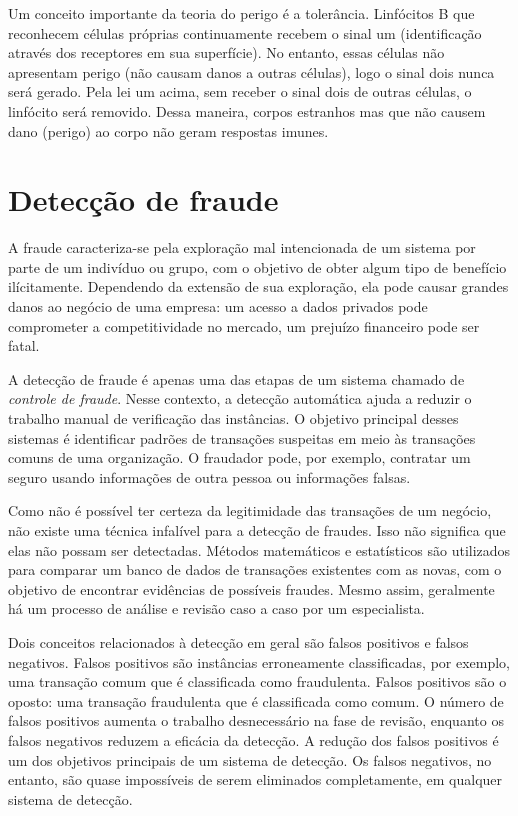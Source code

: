 \documentclass{iiufrgs}
\begin{document}
Um conceito importante da teoria do perigo é a tolerância. Linfócitos B que reconhecem células próprias continuamente recebem o sinal um (identificação através dos receptores em sua superfície). No entanto, essas células não apresentam perigo (não causam danos a outras células), logo o sinal dois nunca será gerado. Pela lei um acima, sem receber o sinal dois de outras células, o linfócito será removido. Dessa maneira, corpos estranhos mas que não causem dano (perigo) ao corpo não geram respostas imunes.

\newpage

\chapter{Detecção de fraude}

A fraude caracteriza-se pela exploração mal intencionada de um sistema por parte de um indivíduo ou grupo, com o objetivo de obter algum tipo de benefício ilícitamente. Dependendo da extensão de sua exploração, ela pode causar grandes danos ao negócio de uma empresa: um acesso a dados privados pode comprometer a competitividade no mercado, um prejuízo financeiro pode ser fatal.

A detecção de fraude é apenas uma das etapas de um sistema chamado de \emph{controle de fraude}. Nesse contexto, a detecção automática ajuda a reduzir o trabalho manual de verificação das instâncias. O objetivo principal desses sistemas é identificar padrões de transações suspeitas em meio às transações comuns de uma organização. O fraudador pode, por exemplo, contratar um seguro usando informações de outra pessoa ou informações falsas.

Como não é possível ter certeza da legitimidade das transações de um negócio, não existe uma técnica infalível para a detecção de fraudes. Isso não significa que elas não possam ser detectadas. Métodos matemáticos e estatísticos são utilizados para comparar um banco de dados de transações existentes com as novas, com o objetivo de encontrar evidências de possíveis fraudes. Mesmo assim, geralmente há um processo de análise e revisão caso a caso por um especialista.

Dois conceitos relacionados à detecção em geral são falsos positivos e falsos negativos. Falsos positivos são instâncias erroneamente classificadas, por exemplo, uma transação comum que é classificada como fraudulenta. Falsos positivos são o oposto: uma transação fraudulenta que é classificada como comum. O número de falsos positivos aumenta o trabalho desnecessário na fase de revisão, enquanto os falsos negativos reduzem a eficácia da detecção. A redução dos falsos positivos é um dos objetivos principais de um sistema de detecção. Os falsos negativos, no entanto, são quase impossíveis de serem eliminados completamente, em qualquer sistema de detecção.
\end{document}

